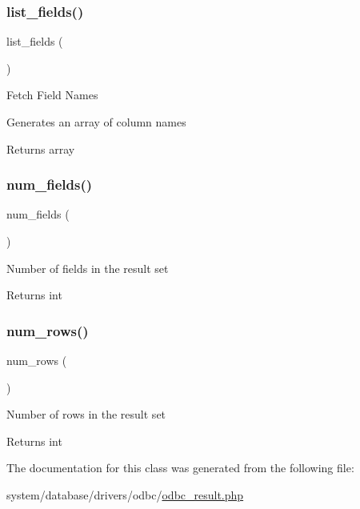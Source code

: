 \subsubsection{\texorpdfstring{list\+\_\+fields()}{list\_fields()}}
{\footnotesize\ttfamily list\+\_\+fields (\begin{DoxyParamCaption}{ }\end{DoxyParamCaption})}

Fetch Field Names

Generates an array of column names

\begin{DoxyReturn}{Returns}
array 
\end{DoxyReturn}
\mbox{\label{class_c_i___d_b__odbc__result_af831bf363e4d7d661a717a4932af449d}} 
\subsubsection{\texorpdfstring{num\+\_\+fields()}{num\_fields()}}
{\footnotesize\ttfamily num\+\_\+fields (\begin{DoxyParamCaption}{ }\end{DoxyParamCaption})}

Number of fields in the result set

\begin{DoxyReturn}{Returns}
int 
\end{DoxyReturn}
\mbox{\label{class_c_i___d_b__odbc__result_a218657c303ee499b97710ab0cd2f5d6e}} 
\subsubsection{\texorpdfstring{num\+\_\+rows()}{num\_rows()}}
{\footnotesize\ttfamily num\+\_\+rows (\begin{DoxyParamCaption}{ }\end{DoxyParamCaption})}

Number of rows in the result set

\begin{DoxyReturn}{Returns}
int 
\end{DoxyReturn}


The documentation for this class was generated from the following file\+:\begin{DoxyCompactItemize}
\item 
system/database/drivers/odbc/\mbox{\hyperlink{odbc__result_8php}{odbc\+\_\+result.\+php}}\end{DoxyCompactItemize}
